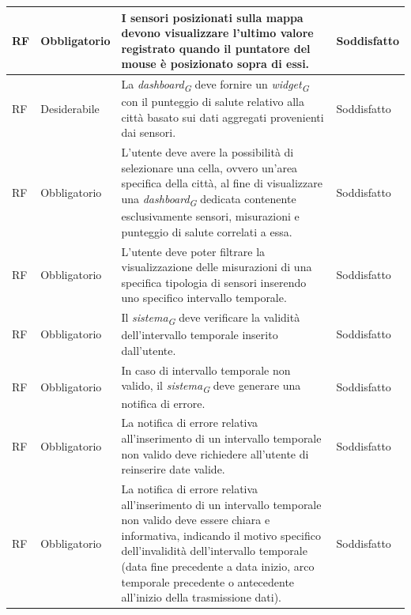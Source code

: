 \begin{longtable}{|C{1.5cm}|C{2cm}|L{5cm}|C{2cm}|}
    \hline
     RF & Obbligatorio &  I sensori posizionati sulla mappa devono visualizzare l'ultimo valore registrato quando il puntatore del mouse è posizionato sopra di essi.& Soddisfatto \\
    
    \hline
     RF & Desiderabile & La \textit{dashboard}\textsubscript{\textit{G}} deve fornire un \textit{widget}\textsubscript{\textit{G}} con il punteggio di salute relativo alla città basato sui dati aggregati provenienti dai sensori.& Soddisfatto \\
    
    \hline
     RF & Obbligatorio & L'utente deve avere la possibilità di selezionare una cella, ovvero un'area specifica della città, al fine di visualizzare una \textit{dashboard}\textsubscript{\textit{G}} dedicata contenente esclusivamente sensori, misurazioni e punteggio di salute correlati a essa.& Soddisfatto \\
    
    \hline
     RF & Obbligatorio & L'utente deve poter filtrare la visualizzazione delle misurazioni di una specifica tipologia di sensori inserendo uno specifico intervallo temporale.& Soddisfatto \\
    
    \hline
     RF & Obbligatorio & Il \textit{sistema}\textsubscript{\textit{G}} deve verificare la validità dell'intervallo temporale inserito dall'utente.& Soddisfatto \\
    
    \hline
     RF & Obbligatorio & In caso di intervallo temporale non valido, il \textit{sistema}\textsubscript{\textit{G}} deve generare una notifica di errore.& Soddisfatto \\
    
    \hline
     RF & Obbligatorio & La notifica di errore relativa all'inserimento di un intervallo temporale non valido deve richiedere all'utente di reinserire date valide.& Soddisfatto \\
    
    \hline
     RF & Obbligatorio & La notifica di errore relativa all'inserimento di un intervallo temporale non valido deve essere chiara e informativa, indicando il motivo specifico dell'invalidità dell'intervallo temporale (data fine precedente a data inizio, arco temporale precedente o antecedente all'inizio della trasmissione dati).& Soddisfatto \\
    

\end{longtable}

